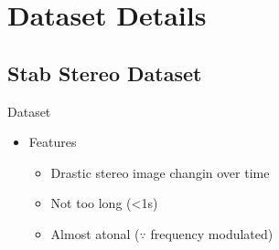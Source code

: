 \section{Dataset Details}
\subsection{Stab Stereo Dataset}
\begin{frame}{Dataset}
    \begin{itemize}
        \begin{columns}
        \begin{column}{.3\textwidth}
        \texttt{[image: assets/figures/square.png]}
        \end{column}
        \end{columns}
        \bigskip
        \item Features
        \begin{itemize}
            \item Drastic stereo image changin over time
            \item Not too long (<1s)
            \item Almost atonal ($\because$ frequency modulated)
        \end{itemize}
    \end{itemize}
\end{frame}

